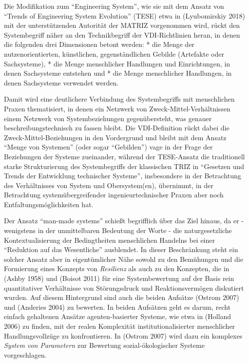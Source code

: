 \documentclass[11pt,a4paper]{article}
\begin{document}
Die Modifikation zum ``Engineering System'', wie sie mit dem Ansatz von
``Trends of Engineering System Evolution'' (TESE) etwa in (Lyubomirskiy
2018) mit der unterstützenden Autorität der MATRIZ vorgenommen wird,
rückt den Systembegriff näher an den Technikbegriff der VDI-Richtlinien
heran, in denen die folgenden drei Dimensionen betont werden: * die
Menge der nutzenorientierten, künstlichen, gegenständlichen Gebilde
(Artefakte oder Sachsysteme), * die Menge menschlicher Handlungen und
Einrichtungen, in denen Sachsysteme entstehen und * die Menge
menschlicher Handlungen, in denen Sachsysteme verwendet werden.

Damit wird eine deutlichere Verbindung des Systembegriffs mit
menschlichen Praxen thematisiert, in denen ein Netzwerk von
Zweck-Mittel-Verhältnissen einem Netzwerk von Systembeziehungen
gegenübersteht, was genauer beschreibungstechnisch zu fassen bleibt. Die
VDI-Definition rückt dabei die Zweck-Mittel-Beziehungen in den
Vordergrund und bleibt mit dem Ansatz ``Menge von Systemen'' (oder sogar
``Gebilden'') vage in der Frage der Beziehungen der Systeme zueinander,
während der TESE-Ansatz die traditionell starke Strukturierung des
Systembegriffs der klassischen TRIZ in ``Gesetzen und Trends der
Entwicklung technischer Systeme'', insbesondere in der Betrachtung des
Verhältnisses von System und Obersystem(en), übernimmt, in der
Betrachtung systemübergreifender ingenieurtechnischer Praxen aber noch
Entfaltungsmöglichkeiten hat.

Der Ansatz ``man-made systems'' schießt begrifflich über das Ziel
hinaus, da er - wenigstens in der unmittelbaren Bedeutung der Worte -
die naturgesetzliche Kontextualisierung der Bedingtheiten menschlichen
Handelns bei einer ``Reduktion auf das Wesentliche'' ausblendet. In
dieser Beschränkung steht ein solcher Ansatz aber in eigentümlicher Nähe
sowohl zu den Bemühungen und die Formierung eines Konzepts von
\emph{Resilienz} als auch zu den Konzepten, die in (Ashby 1958) und
(Boisot 2011) für eine Systembewertung auf der Basis rein quantitativer
Verhältnisse von Störungsdruck und Reaktionsvermögen diskutiert wurden.
Auf diesem Hintergrund sind auch die beiden Aufsätze (Ostrom 2007) und
(Anderies 2004) zu bewerten. In beiden Aufsätzen geht es darum, recht
einfach gehaltenen Ansätze agenten-basierter Systeme, wie etwa in
(Holland 2006) zu finden, mit der realen Komplexität
institutionalisierter menschlicher Handlungsvollzüge zu konfrontieren.
In (Ostrom 2007) wird dazu ein komplexes \emph{System von Parametern}
zur Bewertung sozial-ökologischer Systeme vorgeschlagen.
\end{document}
